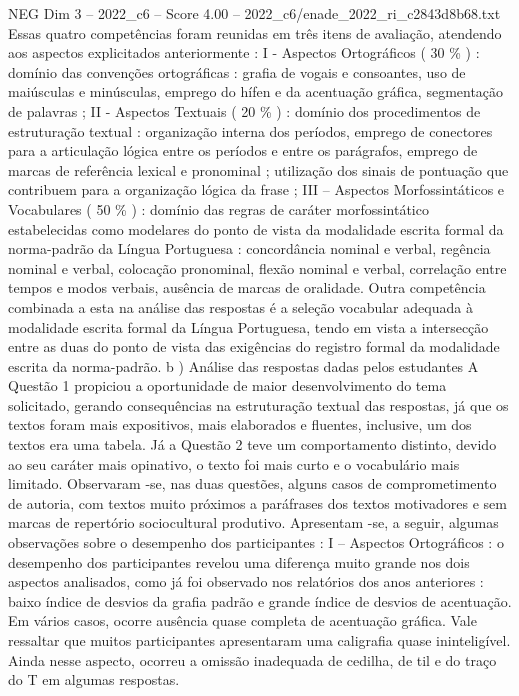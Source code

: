 \begin{textsample}{NEG Dim 3 – 2022\_c6 – Score 4.00 – 2022\_c6/enade\_2022\_ri\_c2843d8b68.txt}
Essas quatro competências foram reunidas em três itens de avaliação, atendendo aos aspectos explicitados anteriormente : I - Aspectos Ortográficos ( 30 \% ) : domínio das convenções ortográficas : grafia de vogais e consoantes, uso de maiúsculas e minúsculas, emprego do hífen e da acentuação gráfica, segmentação de palavras ; II - Aspectos Textuais ( 20 \% ) : domínio dos procedimentos de estruturação textual : organização interna dos períodos, emprego de conectores para a articulação lógica entre os períodos e entre os parágrafos, emprego de marcas de referência lexical e pronominal ; utilização dos sinais de pontuação que contribuem para a organização lógica da frase ; III – Aspectos Morfossintáticos e Vocabulares ( 50 \% ) : domínio das regras de caráter morfossintático estabelecidas como modelares do ponto de vista da modalidade escrita formal da norma-padrão da Língua Portuguesa : concordância nominal e verbal, regência nominal e verbal, colocação pronominal, flexão nominal e verbal, correlação entre tempos e modos verbais, ausência de marcas de oralidade.
Outra competência combinada a esta na análise das respostas é a seleção vocabular adequada à modalidade escrita formal da Língua Portuguesa, tendo em vista a intersecção entre as duas do ponto de vista das exigências do registro formal da modalidade escrita da norma-padrão. b ) Análise das respostas dadas pelos estudantes A Questão 1 propiciou a oportunidade de maior desenvolvimento do tema solicitado, gerando consequências na estruturação textual das respostas, já que os textos foram mais expositivos, mais elaborados e fluentes, inclusive, um dos textos era uma tabela.
Já a Questão 2 teve um comportamento distinto, devido ao seu caráter mais opinativo, o texto foi mais curto e o vocabulário mais limitado.
Observaram -se, nas duas questões, alguns casos de comprometimento de autoria, com textos muito próximos a paráfrases dos textos motivadores e sem marcas de repertório sociocultural produtivo.
Apresentam -se, a seguir, algumas observações sobre o desempenho dos participantes : I – Aspectos Ortográficos : o desempenho dos participantes revelou uma diferença muito grande nos dois aspectos analisados, como já foi observado nos relatórios dos anos anteriores : baixo índice de desvios da grafia padrão e grande índice de desvios de acentuação.
Em vários casos, ocorre ausência quase completa de acentuação gráfica.
Vale ressaltar que muitos participantes apresentaram uma caligrafia quase ininteligível.
Ainda nesse aspecto, ocorreu a omissão inadequada de cedilha, de til e do traço do T em algumas respostas.

\end{textsample}
